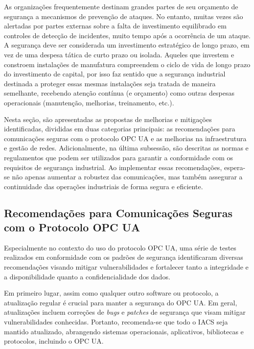     As organizações frequentemente destinam grandes partes de seu orçamento de segurança a mecanismos de prevenção de ataques. No entanto, muitas vezes são alertadas por partes externas sobre a falta de investimento equilibrado em controles de detecção de incidentes, muito tempo após a ocorrência de um ataque. A segurança deve ser considerada um investimento estratégico de longo prazo, em vez de uma despesa tática de curto prazo ou isolada. Aqueles que investem e constroem instalações de manufatura compreendem o ciclo de vida de longo prazo do investimento de capital, por isso faz sentido que a segurança industrial destinada a proteger essas mesmas instalações seja tratada de maneira semelhante, recebendo atenção contínua (e orçamento) como outras despesas operacionais (manutenção, melhorias, treinamento, etc.).

    Nesta seção, são apresentadas as propostas de melhorias e mitigações identificadas, divididas em duas categorias principais: as recomendações para comunicações seguras com o protocolo OPC UA e as melhorias na infraestrutura e gestão de redes. Adicionalmente, na última subsessão, são descritas as normas e regulamentos que podem ser utilizados para garantir a conformidade com os requisitos de segurança industrial. Ao implementar essas recomendações, espera-se não apenas aumentar a robustez das comunicações, mas também assegurar a continuidade das operações industriais de forma segura e eficiente.

    \subsection{Recomendações para Comunicações Seguras com o Protocolo OPC UA}

        Especialmente no contexto do uso do protocolo OPC UA, uma série de testes realizados em conformidade com os padrões de segurança identificaram diversas recomendações visando mitigar vulnerabilidades e fortalecer tanto a integridade e a disponibilidade quanto a confidencialidade dos dados.

        Em primeiro lugar, assim como qualquer outro software ou protocolo, a atualização regular é crucial para manter a segurança do OPC UA. Em geral, atualizações incluem correções de \textit{bugs} e \textit{patches} de segurança que visam mitigar vulnerabilidades conhecidas. Portanto, recomenda-se que todo o IACS seja mantido atualizado, abrangendo sistemas operacionais, aplicativos, bibliotecas e protocolos, incluindo o OPC UA.
        
